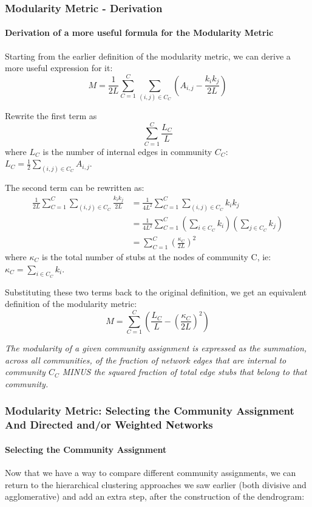 \documentclass[11pt]{scrartcl} %
\begin{document}
\subsubsection{Modularity Metric - Derivation}
\paragraph{Derivation of a more useful formula for the Modularity Metric} Starting from the earlier definition of the modularity metric, we can derive a more useful expression for it:
\[ M = \frac{1}{2L} \sum_{C=1}^{C} \sum_{(i,j)\in C_C} \left(A_{i,j} - \frac{k_i k_j}{2L}\right) \]

Rewrite the first term as 
\[ \sum_{C=1}^C \frac{L_C}{L} \] 
where $L_C$ is the number of internal edges in community $C_C$: $L_C = \frac{1}{2} \sum_{(i,j)\in C_C} A_{i,j} $.

The second term can be rewritten as:
\begin{align*}
\frac{1}{2L} \sum_{C=1}^{C} \sum_{(i,j)\in C_C} \frac{k_i k_j}{2L} & =  \frac{1}{4L^2} \sum_{C=1}^{C} \sum_{(i,j)\in C_C} k_i k_j \\
	& = \frac{1}{4L^2} \sum_{C=1}^{C} \left( \sum_{i \in C_C} k_i \right) \left( \sum_{j \in C_C} k_j \right)  \\
	& = \sum_{C=1}^{C} \left(\frac{\kappa_C}{2L} \right)^2 
\end{align*}
where $\kappa_C$ is the total number of stubs at the nodes of community C, ie: $\kappa_C =  \sum_{i \in C_C} k_i$.

Substituting these two terms back to the original definition, we get an equivalent definition of the modularity metric:
\[ M = \sum_{C=1}^C \left( \frac{L_C}{L} - \left(\frac{\kappa_C}{2L}\right)^2 \right) \]

\emph{The modularity of a given community assignment is expressed as the summation, across all communities, of the fraction of network edges that are internal to community $C_C$ MINUS the squared fraction of total edge stubs that belong to that community.}

\subsubsection{Modularity Metric: Selecting the Community Assignment And Directed and/or Weighted Networks}
\paragraph{Selecting the Community Assignment}
Now that we have a way to compare different community assignments, we can return to the hierarchical clustering approaches we saw earlier (both divisive and agglomerative) and add an extra step, after the construction of the dendrogram:   
\end{document}
